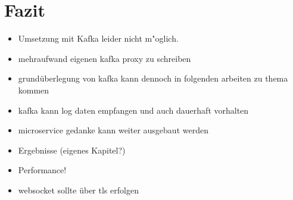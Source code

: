 \chapter{Fazit}
\begin{itemize}
  \item Umsetzung mit Kafka leider nicht m"oglich.
  \item mehraufwand eigenen kafka proxy zu schreiben
  \item grundüberlegung von kafka kann dennoch in folgenden arbeiten zu thema kommen
  \item kafka kann log daten empfangen und auch dauerhaft vorhalten
  \item microservice gedanke kann weiter ausgebaut werden
  \item Ergebnisse (eigenes Kapitel?)
  \item Performance!
  \item websocket sollte über tls erfolgen
\end{itemize}
\clearpage
